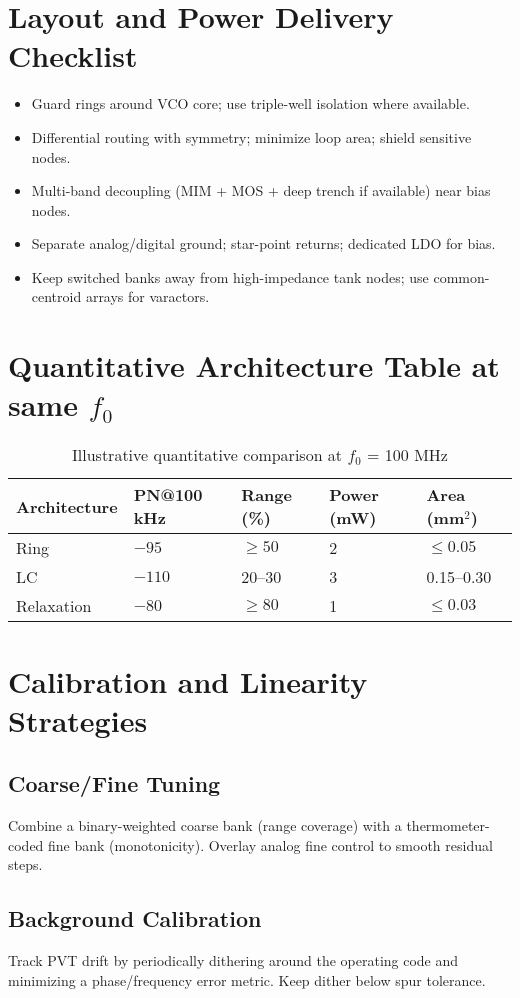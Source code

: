 \section{Layout and Power Delivery Checklist}
\begin{itemize}
  \item Guard rings around VCO core; use triple-well isolation where available.
  \item Differential routing with symmetry; minimize loop area; shield sensitive nodes.
  \item Multi-band decoupling (MIM + MOS + deep trench if available) near bias nodes.
  \item Separate analog/digital ground; star-point returns; dedicated LDO for bias.
  \item Keep switched banks away from high-impedance tank nodes; use common-centroid arrays for varactors.
\end{itemize}

\section{Quantitative Architecture Table at same $f_0$}
\begin{table}[H]
  \centering
  \begin{tabular}{lllll}
    \toprule
    Architecture & PN@100 kHz & Range (\%) & Power (mW) & Area (mm$^2$) \\
    \midrule
    Ring & $-95$ & $\ge 50$ & 2 & $\le 0.05$ \\
    LC   & $-110$ & 20–30 & 3 & 0.15–0.30 \\
    Relaxation & $-80$ & $\ge 80$ & 1 & $\le 0.03$ \\
    \bottomrule
  \end{tabular}
  \caption{Illustrative quantitative comparison at $f_0$ = 100 MHz}
\end{table}

\section{Calibration and Linearity Strategies}
\subsection*{Coarse/Fine Tuning}
Combine a binary-weighted coarse bank (range coverage) with a thermometer-coded fine bank (monotonicity). Overlay analog fine control to smooth residual steps.
\subsection*{Background Calibration}
Track PVT drift by periodically dithering around the operating code and minimizing a phase/frequency error metric. Keep dither below spur tolerance.
